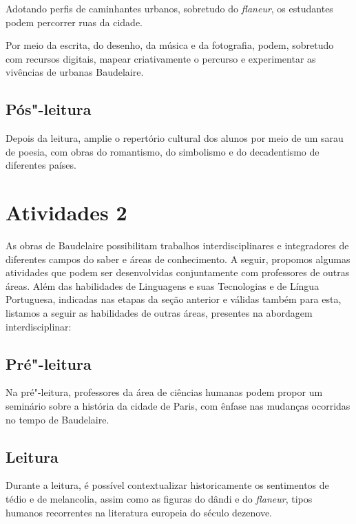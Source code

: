 \documentclass[12pt]{extarticle}
\begin{document}
Adotando perfis de caminhantes urbanos, sobretudo do \textit{flaneur}, os
estudantes podem percorrer ruas da cidade.

Por meio da escrita, do desenho, da música e da fotografia, podem,
sobretudo com recursos digitais, mapear criativamente o percurso e
experimentar as vivências de urbanas Baudelaire.

\subsection{Pós"-leitura}


Depois da leitura, amplie o repertório cultural dos alunos
por meio de um sarau de poesia, com obras do romantismo, do simbolismo
e do decadentismo de diferentes países.


\section{Atividades 2}

As obras de Baudelaire possibilitam trabalhos interdisciplinares e
integradores de diferentes campos do saber e áreas de conhecimento. A
seguir, propomos algumas atividades que podem ser desenvolvidas
conjuntamente com professores de outras áreas. Além das habilidades de
Linguagens e suas Tecnologias e de Língua Portuguesa, indicadas nas
etapas da seção anterior e válidas também para esta, listamos a seguir
as habilidades de outras áreas, presentes na abordagem interdisciplinar:


\subsection{Pré"-leitura}

Na pré"-leitura, professores da área de ciências humanas
podem propor um seminário sobre a história da cidade de Paris, com
ênfase nas mudanças ocorridas no tempo de Baudelaire.

\subsection{Leitura}

Durante a leitura, é possível contextualizar historicamente
os sentimentos de tédio e de melancolia, assim como as figuras do dândi
e do \textit{flaneur}, tipos humanos recorrentes na literatura europeia do
século dezenove.
\end{document}
